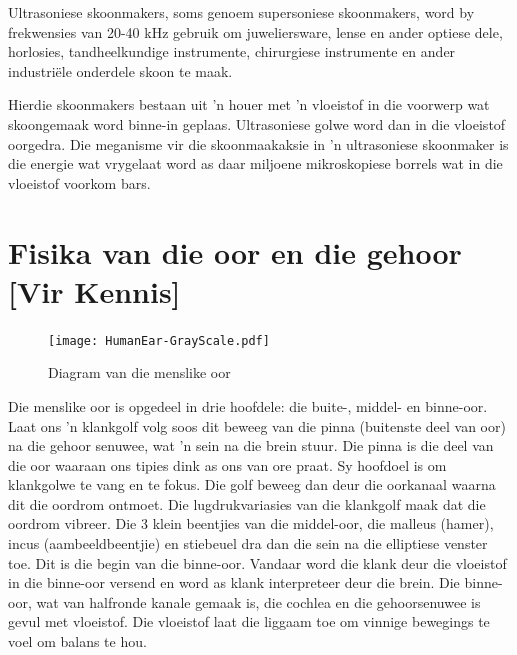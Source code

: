 Ultrasoniese skoonmakers, soms genoem supersoniese skoonmakers, word by frekwensies van 20-40 kHz gebruik om juweliersware, lense en ander optiese dele, horlosies, tandheelkundige instrumente, chirurgiese instrumente en ander industri\"ele onderdele skoon te maak.

Hierdie skoonmakers bestaan uit 'n houer met 'n vloeistof in die voorwerp wat skoongemaak word binne-in geplaas. Ultrasoniese golwe word dan in die vloeistof oorgedra. Die meganisme vir die skoonmaakaksie in 'n ultrasoniese skoonmaker is die energie wat vrygelaat word as daar miljoene mikroskopiese borrels wat in die vloeistof voorkom bars.\par
\label{m38800*notfhsst!!!underscore!!!id482}



\section*{Fisika van die oor en die gehoor [Vir Kennis]}
            \nopagebreak
\begin{figure}[H]
\begin{center}
\texttt{[image: HumanEar-GrayScale.pdf]}
\end{center}
\caption{Diagram van die menslike oor }
\label{Human Ear}
\end{figure}


Die menslike oor is opgedeel in drie hoofdele: die buite-, middel- en binne-oor. Laat ons 'n klankgolf volg soos dit beweeg van die pinna (buitenste deel van oor) na die gehoor senuwee, wat 'n sein na die brein stuur. Die pinna is die deel van die oor waaraan ons tipies dink as ons van ore praat. Sy hoofdoel is om klankgolwe te vang en te fokus. Die golf beweeg dan deur die oorkanaal waarna dit die oordrom ontmoet. Die lugdrukvariasies van die klankgolf maak dat die oordrom vibreer. Die 3 klein beentjies van die middel-oor, die malleus (hamer), incus (aambeeldbeentjie) en stiebeuel dra dan die sein na die elliptiese venster toe. Dit is die begin van die binne-oor. Vandaar word die klank deur die vloeistof in die binne-oor versend en word as klank interpreteer deur die brein. Die binne-oor, wat van halfronde kanale gemaak is, die cochlea en die gehoorsenuwee is gevul met vloeistof. Die vloeistof laat die liggaam toe om vinnige bewegings te voel om balans te hou.
\par


